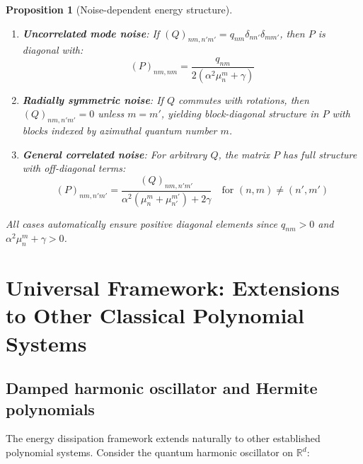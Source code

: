 \documentclass[a4paper,12pt]{article}
\newtheorem{proposition}[theorem]{Proposition}
\def\R{\mathbb{R}}
\begin{document}
\begin{proposition}[Noise-dependent energy structure]\label{prop:noise_structure}
\begin{enumerate}
\item \textbf{Uncorrelated mode noise}: If $(Q)_{nm,n'm'} = q_{nm} \delta_{nn'} \delta_{mm'}$, then $P$ is diagonal with:
\begin{equation}
(P)_{nm,nm} = \frac{q_{nm}}{2(\alpha^2 \mu_n^m + \gamma)}
\end{equation}

\item \textbf{Radially symmetric noise}: If $Q$ commutes with rotations, then $(Q)_{nm,n'm'} = 0$ unless $m = m'$, yielding block-diagonal structure in $P$ with blocks indexed by azimuthal quantum number $m$.

\item \textbf{General correlated noise}: For arbitrary $Q$, the matrix $P$ has full structure with off-diagonal terms:
\begin{equation}
(P)_{nm,n'm'} = \frac{(Q)_{nm,n'm'}}{\alpha^2(\mu_n^m + \mu_{n'}^{m'}) + 2\gamma} \quad \text{for } (n,m) \neq (n',m')
\end{equation}
\end{enumerate}
All cases automatically ensure positive diagonal elements since $q_{nm} > 0$ and $\alpha^2 \mu_n^m + \gamma > 0$.
\end{proposition}

\section{Universal Framework: Extensions to Other Classical Polynomial Systems}\label{sec:universal}

\subsection{Damped harmonic oscillator and Hermite polynomials}

The energy dissipation framework extends naturally to other established polynomial systems. Consider the quantum harmonic oscillator on $\R^d$:
\end{document}
